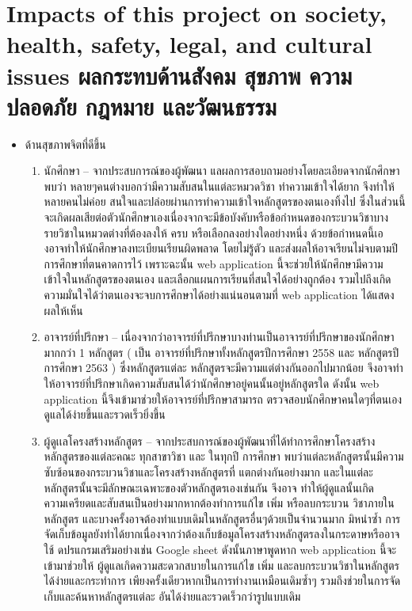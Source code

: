 \section{\ifenglish%
Impacts of this project on society, health, safety, legal, and cultural issues
\else%
ผลกระทบด้านสังคม สุขภาพ ความปลอดภัย กฎหมาย และวัฒนธรรม
\fi}
\begin{itemize}
\item ด้านสุขภาพจิตที่ดีขึ้น
\begin{enumerate}
    \item นักศึกษา --
    จากประสบการณ์ของผู้พัฒนา แลผลการสอบถามอย่างโดยละเอียดจากนักศึกษา พบว่า
    หลายๆคนต่างบอกว่ามีความสับสนในแต่ละหมวดวิชา ทําความเข้าใจได้ยาก จึงทําให้หลายคนไม่ค่อย
    สนใจและปล่อยผ่านการทําความเข้าใจหลักสูตรของตนเองทิ้งไป ซึ่งในส่วนนี้จะเกิดผลเสียต่อตัวนักศึกษาเองเนื่องจากจะมีข้อบังคับหรือข้อกําหนดของกระบวนวิชาบางรายวิชาในหมวดต่างที่ต้องลงให้
    ครบ หรือเลือกลงอย่างใดอย่างหนึ่ง ด้วยข้อกําหนดนี้เองอาจทําให้นักศึกษาลงทะเบียนเรียนผิดพลาด
    โดยไม่รู้ตัว และส่งผลให้อาจเรียนไม่จบตามปีการศึกษาที่ตนคาดการไว้ เพราะฉะนั้น web application
    นี้จะช่วยให้นักศึกษามีความเข้าใจในหลักสูตรของตนเอง และเลือกแผนการเรียนที่สนใจได้อย่างถูกต้อง
    รวมไปถึงเกิดความมั่นใจได้ว่าตนเองจะจบการศึกษาได้อย่างแน่นอนตามที่ web application ได้แสดง
    ผลให้เห็น
    
    \item อาจารย์ที่ปรึกษา --
    เนื่องจากว่าอาจารย์ที่ปรึกษาบางท่านเป็นอาจารย์ที่ปรึกษาของนักศึกษามากกว่า 1 หลักสูตร ( เป็น
    อาจารย์ที่ปรึกษาทั้งหลักสูตรปีการศึกษา 2558 และ หลักสูตรปีการศึกษา 2563 ) ซึ่งหลักสูตรแต่ละ
    หลักสูตรจะมีความแต่ต่างกันออกไปมากน้อย จึงอาจทําให้อาจารย์ที่ปรึกษาเกิดความสับสนได้ว่านักศึกษาอยู่คนนั้นอยู่หลักสูตรใด ดังนั้น web application นี้จึงเข้ามาช่วยให้อาจารย์ที่ปรึกษาสามารถ
    ตรวจสอบนักศึกษาคนใดๆที่ตนเองดูแลได้ง่ายขึ้นและรวดเร็วยิ่งขึ้น

    \item ผู้ดูเเลโครงสร้างหลักสูตร --
    จากประสบการณ์ของผู้พัฒนาที่ได้ทําการศึกษาโครงสร้างหลักสูตรของแต่ละคณะ ทุกสาขาวิชา และ
    ในทุกปี การศึกษา พบว่าแต่ละหลักสูตรนั้นมีความซับซ้อนของกระบวนวิชาและโครงสร้างหลักสูตรที่
    แตกต่างกันอย่างมาก และในแต่ละหลักสูตรนั้นจะมีลักษณะเฉพาะของตัวหลักสูตรเองเช่นกัน จึงอาจ
    ทําให้ผู้ดูแลนั้นเกิดความเครียดและสับสนเป็นอย่างมากหากต้องทําการแก้ไข เพิ่ม หรือลบกระบวน
    วิชาภายในหลักสูตร และบางครั้งอาจต้องทําแบบเดิมในหลักสูตรอื่นๆด้วยเป็นจํานวนมาก มิหนําซํ้า
    การจัดเก็บข้อมูลยังทําได้ยากเนื่องจากว่าต้องเก็บข้อมูลโครงสร้างหลักสูตรลงในกระดาษหรืออาจใช้
    ดปรแกรมเสริมอย่างเช่น Google sheet ดังนั้นภาษาพูดหาก web application นี้จะเข้ามาช่วยให้
    ผู้ดูแลเกิดความสะดวกสบายในการแก้ไข เพิ่ม และลบกระบวนวิชาในหลักสูตรได้ง่ายและกระทําการ
    เพียงครั้งเดียวหากเป็นการทํางานเหมือนเดิมซํ้าๆ รวมถึงช่วยในการจัดเก็บและค้นหาหลักสูตรแต่ละ
    อันได้ง่ายและรวดเร็วกว่ารูปแบบเดิม
    
\end{enumerate}    
\end{itemize}
